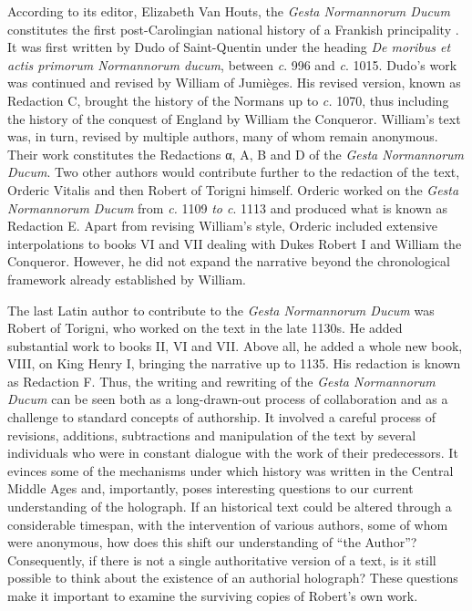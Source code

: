 \begin{paper}
According to its editor, Elizabeth Van Houts, the \emph{Gesta
Normannorum Ducum} constitutes the first post-Carolingian national
history of a Frankish principality \citep[xix]{van_houts_gesta_1992}. It was first
written by Dudo of Saint-Quentin under the heading \emph{De moribus et
actis primorum Normannorum ducum}, between \emph{c}. 996 and \emph{c}.
1015. Dudo's work was continued and revised by William of Jumièges. His
revised version, known as Redaction C, brought the history of the
Normans up to \emph{c.} 1070, thus including the history of the conquest
of England by William the Conqueror. William's text was, in turn,
revised by multiple authors, many of whom remain anonymous. Their work
constitutes the Redactions α, A, B and D of the \emph{Gesta Normannorum
Ducum}. Two other authors would contribute further to the redaction of
the text, Orderic Vitalis and then Robert of Torigni himself. Orderic
worked on the \emph{Gesta Normannorum Ducum} from \emph{c.} 1109
\emph{to c}. 1113 and produced what is known as Redaction E. Apart from
revising William's style, Orderic included extensive interpolations to
books VI and VII dealing with Dukes Robert I and William the Conqueror.
However, he did not expand the narrative beyond the chronological
framework already established by William.

The last Latin author to contribute to the \emph{Gesta Normannorum
Ducum} was Robert of Torigni, who worked on the text in the late 1130s.
He added substantial work to books II, VI and VII. Above all, he added a
whole new book, VIII, on King Henry I, bringing the narrative up to
1135. His redaction is known as Redaction F. Thus, the writing and
rewriting of the \emph{Gesta Normannorum Ducum} can be seen both as a
long-drawn-out process of collaboration and as a challenge to standard
concepts of authorship. It involved a careful process of revisions,
additions, subtractions and manipulation of the text by several
individuals who were in constant dialogue with the work of their
predecessors. It evinces some of the mechanisms under which history was
written in the Central Middle Ages and, importantly, poses interesting
questions to our current understanding of the holograph. If an
historical text could be altered through a considerable timespan, with
the intervention of various authors, some of whom were anonymous, how
does this shift our understanding of ``the Author''? Consequently, if
there is not a single authoritative version of a text, is it still
possible to think about the existence of an authorial holograph? These
questions make it important to examine the surviving copies of Robert's
own work.


\end{paper}
